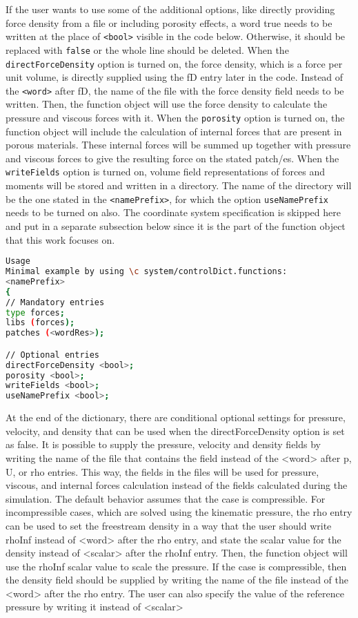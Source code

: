 If the user wants to use some of the additional options, like directly providing force density from a file or including porosity effects, a word true needs to be written at the place of \texttt{<bool>} visible in the code below. Otherwise, it should be replaced with \texttt{false} or the whole line should be deleted. When the \texttt{directForceDensity} option is turned on, the force density, which is a force per unit volume, is directly supplied using the fD entry later in the code. Instead of the \texttt{<word>} after fD, the name of the file with the force density field needs to be written. Then, the function object will use the force density to calculate the pressure and viscous forces with it. When the \texttt{porosity} option is turned on, the function object will include the calculation of internal forces that are present in porous materials. These internal forces will be summed up together with pressure and viscous forces to give the resulting force on the stated patch/es. When the \texttt{writeFields} option is turned on, volume field representations of forces and moments will be stored and written in a directory. The name of the directory will be the one stated in the \texttt{<namePrefix>}, for which the option \texttt{useNamePrefix} needs to be turned on also. The coordinate system specification is skipped here and put in a separate subsection below since it is the part of the function object that this work focuses on.
%
\begin{lstlisting}[language=sh, caption=Mandatory and optional entries for function object forces]
Usage
Minimal example by using \c system/controlDict.functions:
<namePrefix>
{
// Mandatory entries
type forces;
libs (forces);
patches (<wordRes>);

// Optional entries
directForceDensity <bool>;
porosity <bool>;
writeFields <bool>;
useNamePrefix <bool>;
\end{lstlisting}
%
At the end of the dictionary, there are conditional optional settings for pressure, velocity, and density that can be used when the directForceDensity option is set as false. It is possible to supply the pressure, velocity and density fields by writing the name of the file that contains the field instead of the <word> after p, U, or rho entries. This way, the fields in the files will be used for pressure, viscous, and internal forces calculation instead of the fields calculated during the simulation. The default behavior assumes that the case is compressible. For incompressible cases,
which are solved using the kinematic pressure, the rho entry can be used to set the freestream density in a way that the user should write rhoInf instead of <word> after the rho entry, and state the scalar value for the density instead of <scalar> after the rhoInf entry. Then, the function object will use the rhoInf scalar value to scale the pressure. If the case is compressible, then the density field should be supplied by writing the name of the file instead of the <word> after the rho entry. The user can also specify the value of the reference pressure by writing it instead of <scalar>
